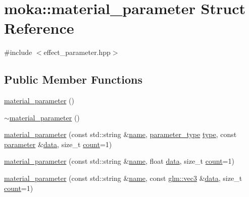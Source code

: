 \hypertarget{structmoka_1_1material__parameter}{}\section{moka\+::material\+\_\+parameter Struct Reference}
\label{structmoka_1_1material__parameter}


{\ttfamily \#include $<$effect\+\_\+parameter.\+hpp$>$}

\subsection*{Public Member Functions}
\begin{DoxyCompactItemize}
\item 
\mbox{\hyperlink{structmoka_1_1material__parameter_a4622b6af2ed13f678f8ab2580c4e1e49}{material\+\_\+parameter}} ()
\item 
\mbox{\hyperlink{structmoka_1_1material__parameter_a7adaa547ba65b7cf7af429b1a636ec0b}{$\sim$material\+\_\+parameter}} ()
\item 
\mbox{\hyperlink{structmoka_1_1material__parameter_a94a402efee42913431a70fc7a7a36247}{material\+\_\+parameter}} (const std\+::string \&\mbox{\hyperlink{structmoka_1_1material__parameter_a9bac68a3935142d56b14332f33b71dc2}{name}}, \mbox{\hyperlink{namespacemoka_aed2224bc0e5b79e57a8975ded94ee1aa}{parameter\+\_\+type}} \mbox{\hyperlink{structmoka_1_1material__parameter_a4a9035370e7b6c97cf89275c712cbd9e}{type}}, const \mbox{\hyperlink{namespacemoka_afdb5f6e8afb209971d12dec045ec48ee}{parameter}} \&\mbox{\hyperlink{structmoka_1_1material__parameter_a13f49bc49ae262cc75f8717869f769eb}{data}}, size\+\_\+t \mbox{\hyperlink{structmoka_1_1material__parameter_ad55b26c96a233450607753c895440581}{count}}=1)
\item 
\mbox{\hyperlink{structmoka_1_1material__parameter_abec6b4aee4053145b455ab53cd5a7bac}{material\+\_\+parameter}} (const std\+::string \&\mbox{\hyperlink{structmoka_1_1material__parameter_a9bac68a3935142d56b14332f33b71dc2}{name}}, float \mbox{\hyperlink{structmoka_1_1material__parameter_a13f49bc49ae262cc75f8717869f769eb}{data}}, size\+\_\+t \mbox{\hyperlink{structmoka_1_1material__parameter_ad55b26c96a233450607753c895440581}{count}}=1)
\item 
\mbox{\hyperlink{structmoka_1_1material__parameter_a6e86cf0f01e3b243a160d7d0cce0508a}{material\+\_\+parameter}} (const std\+::string \&\mbox{\hyperlink{structmoka_1_1material__parameter_a9bac68a3935142d56b14332f33b71dc2}{name}}, const \mbox{\hyperlink{namespacemoka_aed2224bc0e5b79e57a8975ded94ee1aaa97ade28e93c0de60adc075bdbe07ca36}{glm\+::vec3}} \&\mbox{\hyperlink{structmoka_1_1material__parameter_a13f49bc49ae262cc75f8717869f769eb}{data}}, size\+\_\+t \mbox{\hyperlink{structmoka_1_1material__parameter_ad55b26c96a233450607753c895440581}{count}}=1)

\end{DoxyCompactItemize}
